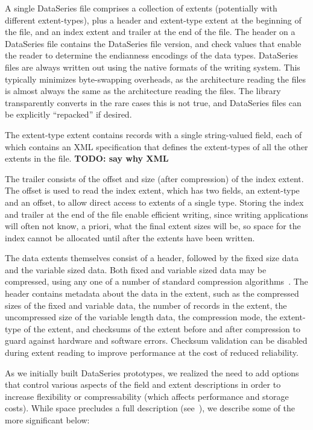 \documentclass{acm_proc_article-sp}
\begin{document}
A single DataSeries file comprises a collection of extents
(potentially with different extent-types), plus a header and
extent-type extent at the beginning of the file, and an index extent
and trailer at the end of the file. The header on a DataSeries file 
contains the DataSeries
file version, and check values that enable the reader to determine the
endianness encodings of the data types.  DataSeries files are always
written out using the native formats of the writing system. This 
typically minimizes byte-swapping overheads, as the architecture 
reading the files is almost always the same as the architecture reading
the files. The library transparently converts in the rare cases this
is not true, and DataSeries files can be explicitly ``repacked'' if desired. 

The
extent-type extent contains records with a single string-valued field,
each of which contains an XML specification that defines the
extent-types of all the other extents in the file. 
{\bf TODO: say why XML}

The trailer
consists of the offset and size (after compression) of the index
extent.  The offset is used to read the index extent, which has two
fields, an extent-type and an offset, to allow direct access to
extents of a single type. Storing the index and trailer at the end
of the file enable efficient writing, since writing applications will
often not know, a priori, what the final extent sizes will be, so space 
for the index cannot be allocated until after the extents have been written.

The data extents themselves consist of a header, followed by the fixed
size data and the variable sized data.  Both fixed and variable sized
data may be compressed, using any one of a number of standard
compression algorithms~\cite{GZIP,BZIP,LZF,LZO}.  The header contains
metadata about the data in the extent, such as the compressed sizes of
the fixed and variable data, the number of records in the extent, the
uncompressed size of the variable length data, the compression mode,
the extent-type of the extent, and checksums of the extent before and
after compression to guard against hardware and software errors.
Checksum validation can be disabled during extent reading to improve
performance at the cost of reduced reliability.

As we initially built DataSeries prototypes, we realized the need to
add options that control various aspects of the field and extent
descriptions in order to increase flexibility or compressability (which
affects performance and storage costs). While space precludes a full
description (see~\cite{DSTechnicalReportSnapshot}), we describe 
some of the more significant below:
\end{document}
